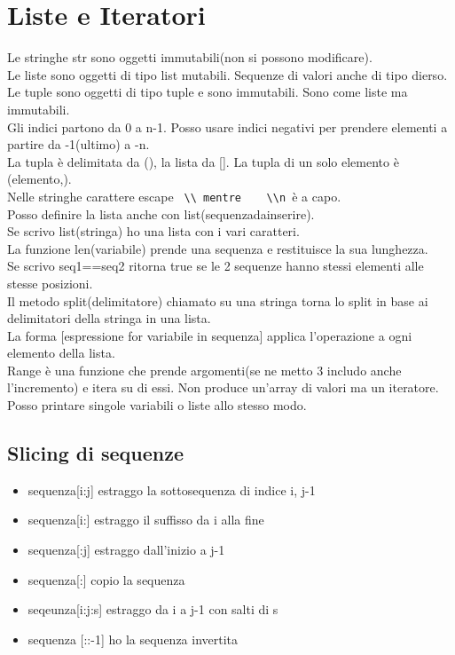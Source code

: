 \chapter{Liste e Iteratori}
Le stringhe str sono oggetti immutabili(non si possono modificare).\\
Le liste sono oggetti di tipo list mutabili. Sequenze di valori anche di tipo dierso.\\
Le tuple sono oggetti di tipo tuple e sono immutabili. Sono come liste ma immutabili.\\
Gli indici partono da 0 a n-1. Posso usare indici negativi per prendere elementi a partire da -1(ultimo) a -n.\\
La tupla è delimitata da (), la lista da []. La tupla di un solo elemento è (elemento,).\\
Nelle stringhe carattere escape \verb| \\ mentre	\\n |è a capo.\\
Posso definire la lista anche con list(sequenzadainserire).\\
Se scrivo list(stringa) ho una lista con i vari caratteri.\\
La funzione len(variabile) prende una sequenza e restituisce la sua lunghezza.\\
Se scrivo seq1==seq2 ritorna true se le 2 sequenze hanno stessi elementi alle stesse posizioni.\\
Il metodo split(delimitatore) chiamato su una stringa torna lo split in base ai delimitatori della stringa in una lista.\\
La forma [espressione for variabile in sequenza] applica l'operazione a ogni elemento della lista.\\
Range è una funzione che prende argomenti(se ne metto 3 includo anche l'incremento) e itera su di essi. Non produce un'array di valori ma un iteratore.\\
Posso printare singole variabili o liste allo stesso modo.\\

\section{Slicing di sequenze}
\begin{itemize}
\item sequenza[i:j] estraggo la sottosequenza di indice i, j-1
\item sequenza[i:] estraggo il suffisso da i alla fine
\item sequenza[:j] estraggo dall'inizio a j-1
\item sequenza[:] copio la sequenza
\item seqeunza[i:j:s] estraggo da i a j-1 con salti di s
\item sequenza [::-1] ho la sequenza invertita
\end{itemize}


